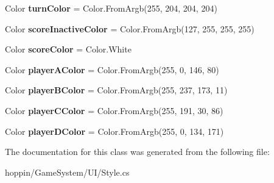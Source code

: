 \begin{DoxyCompactItemize}
\item 
Color {\bfseries turn\+Color} = Color.\+From\+Argb(255, 204, 204, 204)\hypertarget{classhoppin_1_1_game_system_1_1_u_i_1_1_style_a7129c567d3fc4ce13d76fe958cd24be7}{}\label{classhoppin_1_1_game_system_1_1_u_i_1_1_style_a7129c567d3fc4ce13d76fe958cd24be7}

\item 
Color {\bfseries score\+Inactive\+Color} = Color.\+From\+Argb(127, 255, 255, 255)\hypertarget{classhoppin_1_1_game_system_1_1_u_i_1_1_style_ae3b2ce83a09717f9cc120beeadb1803b}{}\label{classhoppin_1_1_game_system_1_1_u_i_1_1_style_ae3b2ce83a09717f9cc120beeadb1803b}

\item 
Color {\bfseries score\+Color} = Color.\+White\hypertarget{classhoppin_1_1_game_system_1_1_u_i_1_1_style_ae70c0b59f4b4c46e8b607d3f0bc7355a}{}\label{classhoppin_1_1_game_system_1_1_u_i_1_1_style_ae70c0b59f4b4c46e8b607d3f0bc7355a}

\item 
Color {\bfseries player\+A\+Color} = Color.\+From\+Argb(255, 0, 146, 80)\hypertarget{classhoppin_1_1_game_system_1_1_u_i_1_1_style_a9beeae8f40f2dd52da47f721e1aae5f5}{}\label{classhoppin_1_1_game_system_1_1_u_i_1_1_style_a9beeae8f40f2dd52da47f721e1aae5f5}

\item 
Color {\bfseries player\+B\+Color} = Color.\+From\+Argb(255, 237, 173, 11)\hypertarget{classhoppin_1_1_game_system_1_1_u_i_1_1_style_af9075232db5b4f2474396195833ac1f9}{}\label{classhoppin_1_1_game_system_1_1_u_i_1_1_style_af9075232db5b4f2474396195833ac1f9}

\item 
Color {\bfseries player\+C\+Color} = Color.\+From\+Argb(255, 191, 30, 86)\hypertarget{classhoppin_1_1_game_system_1_1_u_i_1_1_style_aaca65216a76dff0d9a88eb4796cb2bd2}{}\label{classhoppin_1_1_game_system_1_1_u_i_1_1_style_aaca65216a76dff0d9a88eb4796cb2bd2}

\item 
Color {\bfseries player\+D\+Color} = Color.\+From\+Argb(255, 0, 134, 171)\hypertarget{classhoppin_1_1_game_system_1_1_u_i_1_1_style_a6622111d080eb569f679ed415f730c1f}{}\label{classhoppin_1_1_game_system_1_1_u_i_1_1_style_a6622111d080eb569f679ed415f730c1f}

\end{DoxyCompactItemize}


The documentation for this class was generated from the following file\+:\begin{DoxyCompactItemize}
\item 
hoppin/\+Game\+System/\+U\+I/Style.\+cs\end{DoxyCompactItemize}

